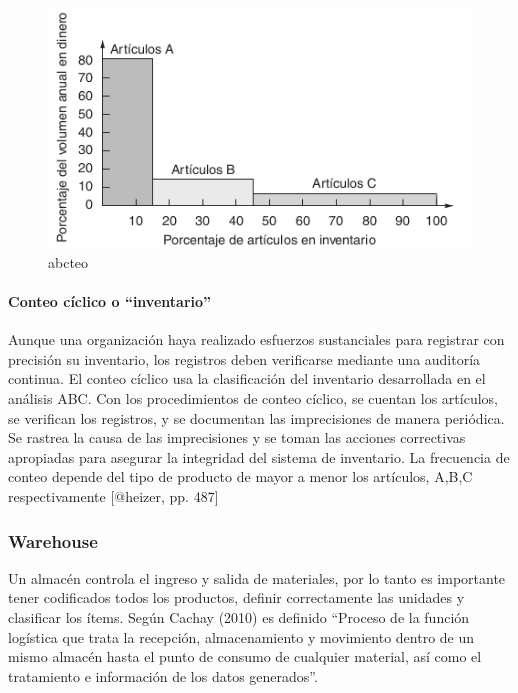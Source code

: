 \documentclass[
]{article}
\begin{document}
\begin{figure}
\centering
\includegraphics{fig/abcteo.png}
\caption{abcteo}
\end{figure}

\hypertarget{conteo-cuxedclico-o-inventario}{%
\paragraph{Conteo cíclico o
``inventario''}\label{conteo-cuxedclico-o-inventario}}

Aunque una organización haya realizado esfuerzos sustanciales para
registrar con precisión su inventario, los registros deben verificarse
mediante una auditoría continua. El conteo cíclico usa la clasificación
del inventario desarrollada en el análisis ABC. Con los procedimientos
de conteo cíclico, se cuentan los artículos, se verifican los registros,
y se documentan las imprecisiones de manera periódica. Se rastrea la
causa de las imprecisiones y se toman las acciones correctivas
apropiadas para asegurar la integridad del sistema de inventario. La
frecuencia de conteo depende del tipo de producto de mayor a menor los
artículos, A,B,C respectivamente {[}@heizer, pp. 487{]}

\hypertarget{warehouse}{%
\subsubsection{Warehouse}\label{warehouse}}

Un almacén controla el ingreso y salida de materiales, por lo tanto es
importante tener codificados todos los productos, definir correctamente
las unidades y clasificar los ítems. Según Cachay (2010) es definido
``Proceso de la función logística que trata la recepción, almacenamiento
y movimiento dentro de un mismo almacén hasta el punto de consumo de
cualquier material, así como el tratamiento e información de los datos
generados''.
\end{document}
